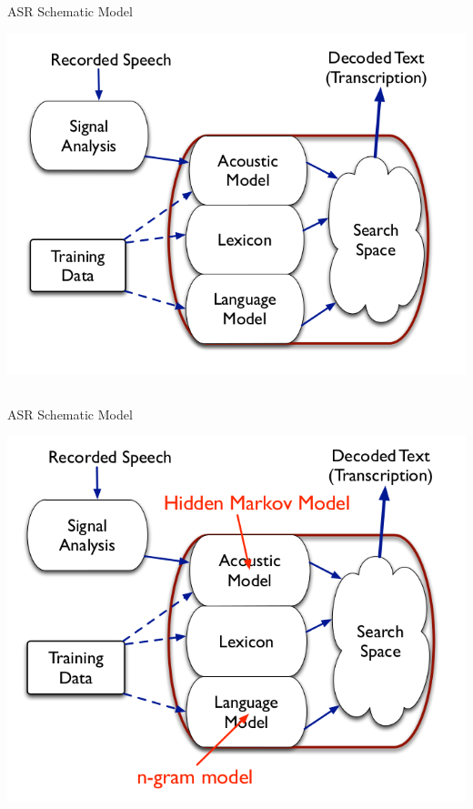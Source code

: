\documentclass[9pt,xcolor=pdftex,dvipsnames,table]{beamer}
\begin{document}
\subsection{}
\begin{frame}{ASR Schematic Model}

	\begin{center}
    \includegraphics[scale=.4]{ASR-model}
	\end{center}
	
\end{frame}

\subsection{}
\begin{frame}{ASR Schematic Model}

	\begin{center}
    \includegraphics[scale=.4]{ASR-model2}
	\end{center}
	
\end{frame}
\end{document}
